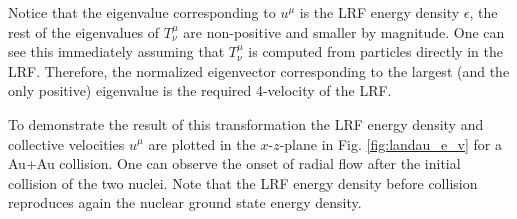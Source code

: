 Notice that the eigenvalue corresponding to $u^{\mu}$ is the LRF energy density
$\epsilon$, the rest of the eigenvalues of $T^{\mu}_{\nu}$ are non-positive and
smaller by magnitude. One can see this immediately assuming that
$T^{\mu}_{\nu}$ is computed from particles directly in the LRF.  Therefore, the
normalized eigenvector corresponding to the largest (and the only positive)
eigenvalue is the required 4-velocity of the LRF.

To demonstrate the result of this transformation the LRF energy density and
collective velocities $u^\mu$ are plotted in the $x$-$z$-plane in Fig.
\ref{fig:landau_e_v} for a Au+Au collision. One can observe the onset of radial
flow after the initial collision of the two nuclei. Note that the LRF energy
density before collision reproduces again the nuclear ground state energy
density.

